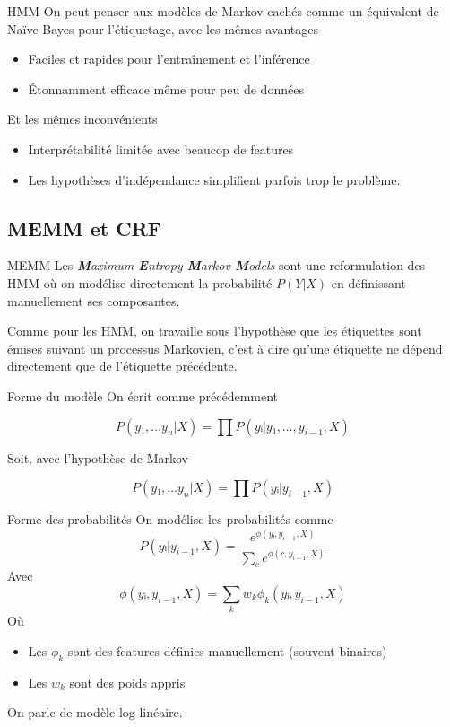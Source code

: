 \documentclass[hyperref={unicode}, xcolor={svgnames}, french]{beamer}
\begin{document}
\begin{frame}{HMM}
	On peut penser aux modèles de Markov cachés comme un équivalent de Naïve Bayes pour l'étiquetage, avec les mêmes avantages
	\begin{itemize}
		\item Faciles et rapides pour l'entraînement et l'inférence
		\item Étonnamment efficace même pour peu de données
	\end{itemize}
	Et les mêmes inconvénients
	\begin{itemize}
		\item Interprétabilité limitée avec beaucop de features
		\item Les hypothèses d'indépendance simplifient parfois trop le problème.
	\end{itemize}
\end{frame}

\subsection{MEMM et CRF}
\begin{frame}{MEMM}
	Les \alert{\textit{\textbf{M}aximum \textbf{E}ntropy \textbf{M}arkov \textbf{M}odels}} sont une reformulation des HMM où on modélise directement la probabilité $P(Y|X)$ en définissant manuellement ses composantes.

	Comme pour les HMM, on travaille sous l'hypothèse que les étiquettes sont émises suivant un processus Markovien, c'est à dire qu'une étiquette ne dépend directement que de l'étiquette précédente.
\end{frame}

\begin{frame}{Forme du modèle}
	On écrit comme précédemment

	\begin{equation}
		P(y₁,…y_n|X) = ∏P(yᵢ|y₁,…, y_{i-1}, X)
	\end{equation}

	Soit, avec l'hypothèse de \alert{Markov}

	\begin{equation}
		P(y₁,…y_n|X) = ∏P(yᵢ|y_{i-1}, X)
	\end{equation}
\end{frame}

\begin{frame}{Forme des probabilités}
	On modélise les probabilités comme
	\begin{equation}
		P(yᵢ|y_{i-1}, X) = \frac{e^{ϕ(yᵢ, y_{i-1}, X)}}{∑_c e^{ϕ(c, y_{i-1}, X)}}
	\end{equation}
	Avec
	\begin{equation}
		ϕ(yᵢ, y_{i-1}, X) = \sum_k w_k  ϕ_k(yᵢ, y_{i-1}, X)
	\end{equation}
	Où
	\begin{itemize}
		\item Les $ϕ_k$ sont des features définies manuellement (souvent binaires)
		\item Les $w_k$ sont des poids appris
	\end{itemize}

	On parle de modèle \alert{log-linéaire}.
\end{frame}
\end{document}
